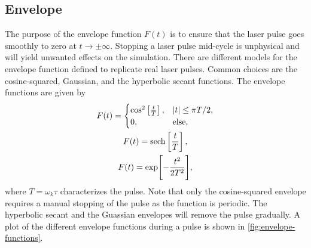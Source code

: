        \subsection{Envelope}
            The purpose of the envelope function $F(t)$ is to ensure that the
            laser pulse goes smoothly to zero at $t \to \pm \infty$.
            Stopping a laser pulse mid-cycle is unphysical and will yield
            unwanted effects on the simulation.
            There are different models for the envelope function defined to
            replicate real laser pulses.
            Common choices are the cosine-squared, Gaussian, and the hyperbolic
            secant functions.
            The envelope functions are given by
            \begin{gather}
                F(t) = \begin{cases}
                    \cos^2\brak{
                        \frac{t}{T}
                    }, & \abs{t} \leq \pi T/2, \\
                    0, & \text{else},
                \end{cases}
                \\
                F(t) = \sech\brak{
                    \frac{t}{T}
                }, \\
                F(t) = \exp[
                    -\frac{t^2}{2T^2}
                ],
            \end{gather}
            where $T = \omega_k\tau$ characterizes the pulse.
            Note that only the cosine-squared envelope requires a manual
            stopping of the pulse as the function is periodic.
            The hyperbolic secant and the Guassian envelopes will remove the
            pulse gradually.
            A plot of the different envelope functions during a pulse is shown
            in \autoref{fig:envelope-functions}.

